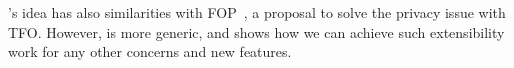 \tcpls's idea has also similarities with \tls FOP~\cite{sy2020enhanced}, a
proposal to solve the privacy issue with TFO. However, \tcpls is more generic,
and shows how we can achieve such extensibility work for any other concerns and
new features.















